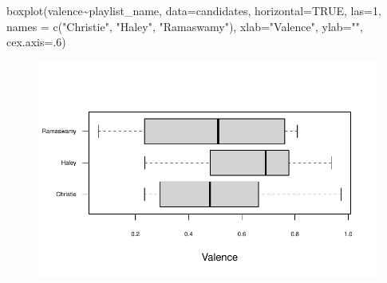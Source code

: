 \documentclass[
  letterpaper,
  DIV=11,
  numbers=noendperiod]{scrreprt}
\newenvironment{Shaded}{\begin{snugshade}}{\end{snugshade}}
\newcommand{\AttributeTok}[1]{\textcolor[rgb]{0.40,0.45,0.13}{#1}}
\newcommand{\ConstantTok}[1]{\textcolor[rgb]{0.56,0.35,0.01}{#1}}
\newcommand{\DecValTok}[1]{\textcolor[rgb]{0.68,0.00,0.00}{#1}}
\newcommand{\FunctionTok}[1]{\textcolor[rgb]{0.28,0.35,0.67}{#1}}
\newcommand{\NormalTok}[1]{\textcolor[rgb]{0.00,0.23,0.31}{#1}}
\newcommand{\OtherTok}[1]{\textcolor[rgb]{0.00,0.23,0.31}{#1}}
\newcommand{\SpecialCharTok}[1]{\textcolor[rgb]{0.37,0.37,0.37}{#1}}
\newcommand{\StringTok}[1]{\textcolor[rgb]{0.13,0.47,0.30}{#1}}
\begin{document}
\begin{Shaded}
\begin{Highlighting}[]
\FunctionTok{boxplot}\NormalTok{(valence}\SpecialCharTok{\textasciitilde{}}\NormalTok{playlist\_name, }\AttributeTok{data=}\NormalTok{candidates, }\AttributeTok{horizontal=}\ConstantTok{TRUE}\NormalTok{, }\AttributeTok{las=}\DecValTok{1}\NormalTok{, }
        \AttributeTok{names =} \FunctionTok{c}\NormalTok{(}\StringTok{"Christie"}\NormalTok{, }\StringTok{"Haley"}\NormalTok{,}
                                                                                \StringTok{"Ramaswamy"}\NormalTok{), }
        \AttributeTok{xlab=}\StringTok{"Valence"}\NormalTok{, }\AttributeTok{ylab=}\StringTok{""}\NormalTok{,}
        \AttributeTok{cex.axis=}\NormalTok{.}\DecValTok{6}\NormalTok{)}
\end{Highlighting}
\end{Shaded}

\begin{figure}[H]

{\centering \includegraphics{11-TextasData_files/figure-pdf/unnamed-chunk-30-1.pdf}

}

\end{figure}

\begin{Shaded}
\end{Shaded}
\end{document}
